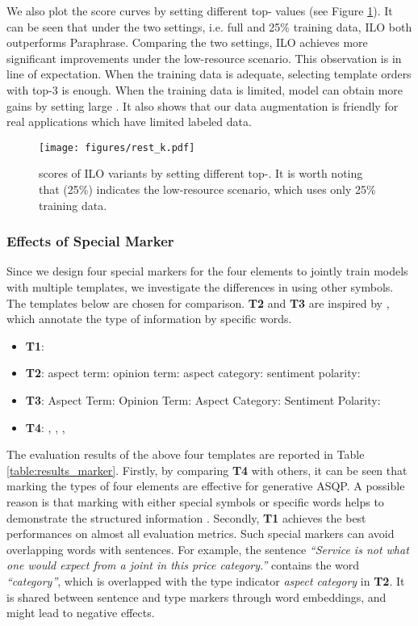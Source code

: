 \documentclass[11pt]{article}
\begin{document}
We also plot the  score curves by setting different top- values (see Figure \ref{fig:figure_scale}). It can be seen that under the two settings, i.e. full and 25\% training data, ILO both outperforms Paraphrase. Comparing the two settings, ILO achieves more significant improvements under the low-resource scenario. This observation is in line of expectation. When the training data is adequate, selecting template orders with top-3 is enough. When the training data is limited, model can obtain more gains by setting large . It also shows that our data augmentation is friendly for real applications which have limited labeled data. 

\begin{figure}[t]
\centering
\texttt{[image: figures/rest\_k.pdf]} 
\caption{ scores of ILO variants by setting different top-. It is worth noting that (25\%) indicates the low-resource scenario, which uses only 25\% training data.}
\label{fig:figure_scale}
\end{figure}




\subsubsection{Effects of Special Marker}
Since we design four special markers for the four elements to jointly train models with multiple templates, we investigate the differences in using other symbols. The templates below are chosen for comparison. \textbf{T2} and \textbf{T3} are inspired by \citet{chia-etal-2022-relationprompt}, which annotate the type of information by specific words.


\begin{itemize}
    \item \textbf{T1}:        
    \item \textbf{T2}: aspect term:  opinion term:  aspect category:  sentiment polarity: 
    \item \textbf{T3}: Aspect Term:  Opinion Term:  Aspect Category:  Sentiment Polarity: 
    \item \textbf{T4}: , , , 
\end{itemize}

The evaluation results of the above four templates are reported in Table \ref{table:results_marker}. Firstly, by comparing \textbf{T4} with others, it can be seen that marking the types of four elements are effective for generative ASQP. A possible reason is that marking with either special symbols or specific words helps to demonstrate the structured information \cite{paolini2021structured}. Secondly, \textbf{T1} achieves the best performances on almost all evaluation metrics. Such special markers can avoid overlapping words with sentences. For example, the sentence \emph{``Service is not what one would expect from a joint in this price category.''} contains the word \emph{``category''}, which is overlapped with the type indicator \emph{aspect category} in \textbf{T2}. It is shared between sentence and type markers through word embeddings, and might lead to negative effects.
\end{document}
